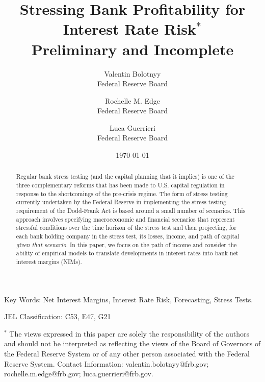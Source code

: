 \documentclass[11pt]{article}
\renewcommand{\baselinestretch}{1.5}
\begin{document}
\renewcommand{\baselinestretch}{1}
\author{{\Large Valentin Bolotnyy} \\
Federal Reserve Board \and
{\Large Rochelle M. Edge} \\
Federal Reserve Board \and
{\Large Luca Guerrieri}\\ Federal Reserve Board} 
\title{Stressing Bank Profitability for Interest Rate Risk$^*$ \\ \vspace{0.5cm} Preliminary and Incomplete \vspace{0.5cm}}

 
\date{\today}
\maketitle

\begin{abstract}
\noindent Regular bank stress testing (and the capital planning that it implies) is one of the three complementary reforms that has been made to U.S. capital regulation in response to the shortcomings of the pre-crisis regime. The form of stress testing currently undertaken by the Federal Reserve in implementing the stress testing requirement of the Dodd-Frank Act is based around a small number of scenarios.  This approach involves specifying macroeconomic and financial scenarios that represent stressful conditions over the time horizon of the stress test and then projecting, for each bank holding company in the stress test, its losses, income, and path of capital \textit{given that scenario}. In this paper, we focus on the path of income and consider the ability of empirical models to translate developments in interest rates into bank net interest margins (NIMs).
\end{abstract}

\vspace{.125in}

\noindent Key Words: Net Interest Margins, Interest Rate Risk, Forecasting, Stress Tests.

\vspace{.125in}

\noindent JEL Classification: C53, E47, G21

\vspace{1.5cm} \renewcommand{\baselinestretch}{1} \normalsize
\noindent $^*$ The views
expressed in this paper are solely the responsibility of the
authors and should not be interpreted as reflecting the views of
the Board of Governors of the Federal Reserve System or of any
other person associated with the Federal Reserve System.
Contact Information: valentin.bolotnyy@frb.gov; rochelle.m.edge@frb.gov; luca.guerrieri@frb.gov.
\end{document}
